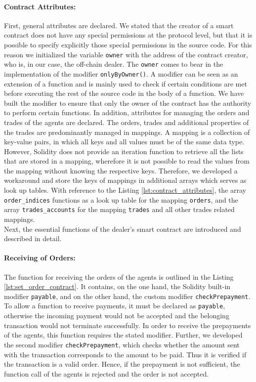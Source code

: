 \paragraph{Contract Attributes:} First, general attributes are declared.
We stated that the creator of a smart contract does not have any special permissions at the protocol level, but
that it is possible to specify explicitly those special permissions in the source code.  
For this reason we initialized the variable \verb|owner| with the address of the contract creator, who is, in our case,
the off-chain dealer. The \verb|owner| comes to bear in the implementation of the modifier \verb|onlyByOwner()|.
A modifier can be seen as an extension of a function and is mainly used to
check if certain conditions are met before executing the rest of the source code in the body of a function.
We have built the modifier to ensure that only the owner of the contract has the authority to perform certain functions.
In addition, attributes for managing the orders and trades of the agents are declared. 
The orders, trades and additional properties of the trades are predominantly managed in mappings.
A mapping is a collection of key-value pairs, in which all keys and all values must be of the same 
data type. However, Solidity does not provide an iteration
function to retrieve all the lists that are stored in a mapping, wherefore it is not possible 
to read the values from the mapping without knowing the respective keys.
Therefore, we developed a workaround and store the keys of mappings in additional arrays which serves 
as look up tables.
With reference to the Listing \ref{lst:contract_attributes}, the array \verb|order_indices| functions as a 
look up table for the mapping \verb|orders|, and the array \verb|trades_accounts| for the mapping 
\verb|trades| and all other trades related mappings. \\

Next, the essential functions of the dealer's smart contract are introduced and described in detail.

\paragraph{Receiving of Orders:} The function for receiving the orders of the agents is outlined in the Listing \ref{lst:set_order_contract}.
It contains, on the one hand, the Solidity built-in modifier \verb|payable|, and on the other hand, the custom
modifier \verb|checkPrepayment|. To allow a function to receive payments, it must be declared as \verb|payable|,
otherwise the incoming payment would not be accepted and the belonging transaction would not terminate successfully.
In order to receive the prepayments of the agents, this function requires the stated modifier.
Further, we developed the second modifier \verb|checkPrepayment|, which checks whether the amount sent with the 
transaction corresponds to the amount to be paid. Thus it is verified if the transaction is a valid order.
Hence, if the prepayment is not sufficient, the function call of the agents is rejected and 
the order is not accepted.


